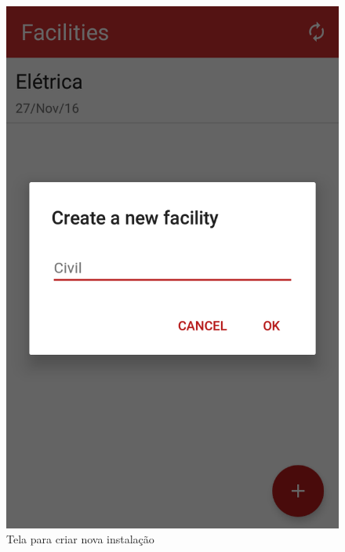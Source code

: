 \begin{figure}[H]
  \centering
  \begin{minipage}[b]{0.4\textwidth}
    \includegraphics[width=\textwidth]{imagens/screenshots/newFacility.png}
    \caption{Tela para criar nova instalação}
  \end{minipage}
  \hfill
  \begin{minipage}[b]{0.4\textwidth}

\end{minipage}
\end{figure}
